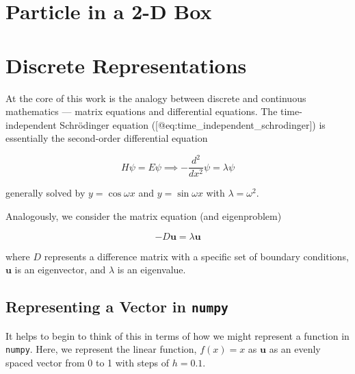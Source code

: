 \documentclass[12pt,]{book}
\begin{document}
\section{Particle in a 2-D Box}\label{particle-in-a-2-d-box}

\newcommand{\vecu}{\mathbf{u}}

\newcommand{\ddx}{\frac{d}{dx}}

\section{Discrete Representations}\label{discrete-representations}

At the core of this work is the analogy between discrete and continuous
mathematics --- matrix equations and differential equations. The
time-independent Schrödinger equation
({[}@eq:time\_independent\_schrodinger{]}) is essentially the
second-order differential equation

\begin{equation}H\psi=E\psi \implies -\frac{d^2 }{dx^2}\psi=\lambda \psi\label{eq:second_order_diff_eqn}\end{equation}

generally solved by \(y=\cos \omega x\) and \(y=\sin\omega x\) with
\(\lambda =\omega^2\).

Analogously, we consider the matrix equation (and eigenproblem)

\begin{equation} - D\mathbf{u} = \lambda \mathbf{u}\label{eq:second_difference_eigenproblem}\end{equation}

where \(D\) represents a difference matrix with a specific set of
boundary conditions, \(\mathbf{u}\) is an eigenvector, and \(\lambda\)
is an eigenvalue.

\subsection{\texorpdfstring{Representing a Vector in
\texttt{numpy}}{Representing a Vector in numpy}}\label{representing-a-vector-in-numpy}

It helps to begin to think of this in terms of how we might represent a
function in \texttt{numpy}. Here, we represent the linear function,
\(f(x)=x\) as \(\vecu\) as an evenly spaced vector from 0 to 1 with
steps of \(h=0.1\).
\end{document}
